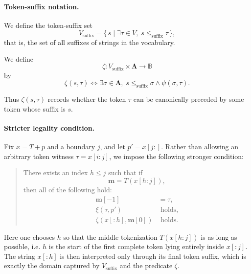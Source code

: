 \paragraph{Token-suffix notation.}
We define the token-suffix set
\[
    V_{\mathrm{suffix}}
    =
    \{\, s \mid \exists \tau \in V,\; s \leq_{\mathrm{suffix}} \tau \,\},
\]
that is, the set of all suffixes of strings in the vocabulary.

\begin{definition}
    We define
    \[
        \zeta : V_{\mathrm{suffix}} \times \boldsymbol{\Lambda} \to \mathbb{B}
    \]
    by
    \[
        \zeta(s, \tau)
        \iff
        \exists \sigma \in \boldsymbol{\Lambda},
        \;
        s \leq_{\mathrm{suffix}} \sigma
        \land
        \psi(\sigma, \tau).
    \]
\end{definition}

Thus $\zeta(s,\tau)$ records whether the token $\tau$ can be canonically
preceded by some token whose suffix is $s$.

\paragraph{Stricter legality condition.}
Fix $x = T + p$ and a boundary $j$, and let $p' = x[j:]$.
Rather than allowing an arbitrary token witness $\tau = x[i:j]$, we impose the
following stronger condition:

\begin{quote}
There exists an index $h \leq j$ such that if
\[
    \mathbf{m} = T(x[h:j]),
\]
then all of the following hold:
\begin{align*}
    \mathbf{m}[-1] &= \tau, \\
    \xi(\tau, p') &\text{ holds}, \\
    \zeta(x[:h], \mathbf{m}[0]) &\text{ holds.}
\end{align*}
\end{quote}

Here one chooses $h$ so that the middle tokenization $T(x[h:j])$ is as long as
possible, i.e. $h$ is the start of the first complete token lying entirely
inside $x[:j]$. The string $x[:h]$ is then interpreted only through its final
token suffix, which is exactly the domain captured by $V_{\mathrm{suffix}}$ and
the predicate $\zeta$.

